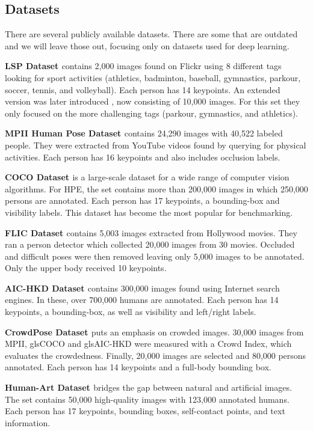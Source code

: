 \subsection{Datasets}
There are several publicly available datasets.
There are some that are outdated and we will leave those out, focusing only on datasets used for deep learning.

\textbf{\gls{LSP} Dataset \cite{Johnson2010}} contains 2,000 images found on Flickr using 8 different tags looking for sport activities (athletics, badminton, baseball, gymnastics, parkour, soccer, tennis, and volleyball).
Each person has 14 keypoints.
An extended version was later introduced \cite{Johnson2011}, now consisting of 10,000 images. 
For this set they only focused on the more challenging tags (parkour, gymnastics, and athletics).

\textbf{\gls{MPII} Human Pose Dataset \cite{Andriluka2014}} contains 24,290 images with 40,522 labeled people.
They were extracted from YouTube videos found by querying for physical activities.
Each person has 16 keypoints and also includes occlusion labels.

\textbf{\gls{COCO} Dataset \cite{Lin2014}} is a large-scale dataset for a wide range of computer vision algorithms.
For \gls{HPE}, the set contains more than 200,000 images in which 250,000 persons are annotated.
Each person has 17 keypoints, a bounding-box and visibility labels.
This dataset has become the most popular for benchmarking.

\textbf{\gls{FLIC} Dataset \cite{Sap2013}} contains 5,003 images extracted from Hollywood movies.
They ran a person detector which collected 20,000 images from 30 movies.
Occluded and difficult poses were then removed leaving only 5,000 images to be annotated.
Only the upper body received 10 keypoints.

\textbf{\gls{AIC-HKD} Dataset \cite{Sap2013}} contains 300,000 images found using Internet search engines.
In these, over 700,000 humans are annotated.
Each person has 14 keypoints, a bounding-box, as well as visibility and left/right labels.

\textbf{CrowdPose Dataset \cite{Li2018}} puts an emphasis on crowded images.
30,000 images from \gls{MPII}, gls{COCO} and gls{AIC-HKD} were measured with a Crowd Index, which evaluates the crowdedness.
Finally, 20,000 images are selected and 80,000 persons annotated.
Each person has 14 keypoints and a full-body bounding box.

\textbf{Human-Art Dataset \cite{Ju2023}} bridges the gap between natural and artificial images.
The set contains 50,000 high-quality images with 123,000 annotated humans.
Each person has 17 keypoints, bounding boxes, self-contact points, and text information.

